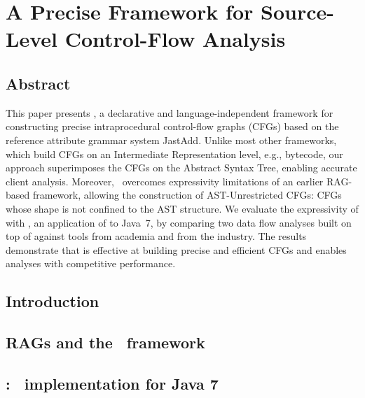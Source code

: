 

\chapter[A Precise Framework for Source-Level Control-Flow Analysis]{\texorpdfstring{%
A Precise Framework for Source-Level Control-Flow Analysis}{%
A Precise Framework for Source-Level Control-Flow Analysis}}

\paperRemark{\paperIref}




\section{Abstract}
This paper presents \intracfg, a declarative and language-independent framework for constructing precise intraprocedural control-flow graphs (CFGs) based on the reference attribute grammar system JastAdd. Unlike most other frameworks, which build CFGs on an Intermediate Representation level, e.g., bytecode,  our approach superimposes the CFGs on the Abstract Syntax Tree, enabling accurate client analysis.
Moreover, \intracfg\ overcomes expressivity limitations of an earlier RAG-based framework, allowing the construction of AST-Unrestricted CFGs: CFGs whose shape is not confined to the AST structure.
We evaluate the expressivity of {\intracfg} with {\intraj}, an application of {\intracfg} to Java~7,
by comparing two data flow analyses built on top of {\intraj} against tools from academia and from the industry.
The results demonstrate that {\intraj} is effective at building precise and efficient CFGs and enables analyses with competitive performance.




\section{Introduction}
\label{sec:introduction}



\section{RAGs and the \intracfg\ framework}
\label{sec:framework}



\section{\intraj: \intracfg\  implementation for Java 7}
\label{sec:implementation}


